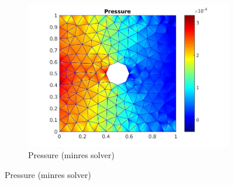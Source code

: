 \documentclass[a4paper]{book}
\begin{document}
\begin{figure}[H]
\begin{subfigure}{\textwidth}
  \includegraphics[width=\linewidth]{cylinder_minres_pressure.jpg}
  \caption{Pressure (minres solver)}
  \label{pressure_stoke_minres}
\end{subfigure}
\label{flow_over_cylinder_minres}
\end{figure}
\end{document}
